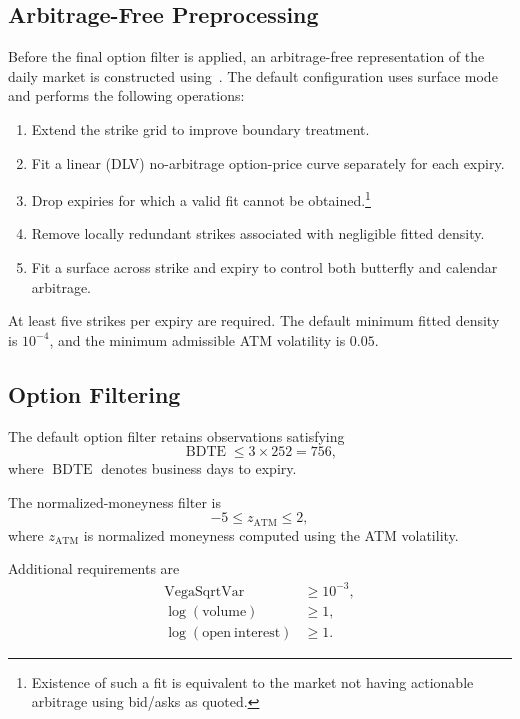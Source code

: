 \documentclass[11pt,a4paper]{article}
\begin{document}
\subsection{Arbitrage-Free Preprocessing}

Before the final option filter is applied, an arbitrage-free representation of the daily market is constructed using~\cite{SANOS2026}. The default configuration uses surface mode and performs the following operations:
%
\begin{enumerate}
    \item Extend the strike grid to improve boundary treatment.
    \item Fit a linear (DLV) no-arbitrage option-price curve separately for each expiry.
    \item Drop expiries for which a valid fit cannot be obtained.\footnote{
        Existence of such a fit is equivalent to the market not having actionable arbitrage
        using bid/asks as quoted.    
    }
    \item Remove locally redundant strikes associated with negligible fitted density.
    \item Fit a surface across strike and expiry to control both butterfly and calendar arbitrage.
\end{enumerate}

At least five strikes per expiry are required. The default minimum fitted density is \(10^{-4}\), and the minimum admissible ATM volatility is \(0.05\).

\subsection{Option Filtering}

The default option filter retains observations satisfying
%
\[
    \operatorname{BDTE} \leq 3 \times 252 = 756,
\]
%
where \(\operatorname{BDTE}\) denotes business days to expiry.

The normalized-moneyness filter is
%
\[
    -5 \leq z_{\mathrm{ATM}} \leq 2,
\]
%
where \(z_{\mathrm{ATM}}\) is normalized moneyness computed using the ATM volatility.

Additional requirements are
%
\[
\begin{aligned}
    \mathrm{VegaSqrtVar} &\geq 10^{-3}, \\
    \log(\mathrm{volume}) &\geq 1, \\
    \log(\mathrm{open\ interest}) &\geq 1.
\end{aligned}
\]
\end{document}
